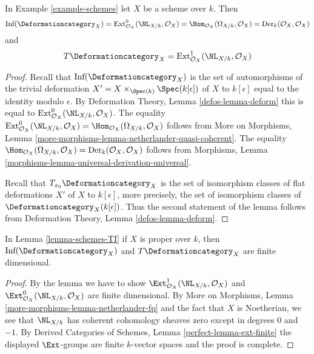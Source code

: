 \begin{lemma}
\label{lemma-schemes-TI}
In Example \ref{example-schemes} let $X$ be a scheme over $k$. Then
$$
\text{Inf}(\Deformationcategory_X) =
\text{Ext}^0_{\mathcal{O}_X}(\NL_{X/k}, \mathcal{O}_X) =
\Hom_{\mathcal{O}_X}(\Omega_{X/k}, \mathcal{O}_X) =
\text{Der}_k(\mathcal{O}_X, \mathcal{O}_X)
$$
and
$$
T\Deformationcategory_X =
\text{Ext}^1_{\mathcal{O}_X}(\NL_{X/k}, \mathcal{O}_X)
$$
\end{lemma}

\begin{proof}
Recall that $\text{Inf}(\Deformationcategory_X)$ is the set of
automorphisms of the trivial deformation
$X' = X \times_{\Spec(k)} \Spec(k[\epsilon])$ of $X$ to $k[\epsilon]$
equal to the identity modulo $\epsilon$.
By Deformation Theory, Lemma \ref{defos-lemma-deform}
this is equal to $\text{Ext}^0_{\mathcal{O}_X}(\NL_{X/k}, \mathcal{O}_X)$.
The equality $\text{Ext}^0_{\mathcal{O}_X}(\NL_{X/k}, \mathcal{O}_X) =
\Hom_{\mathcal{O}_X}(\Omega_{X/k}, \mathcal{O}_X)$ follows from
More on Morphisms, Lemma
\ref{more-morphisms-lemma-netherlander-quasi-coherent}.
The equality
$\Hom_{\mathcal{O}_X}(\Omega_{X/k}, \mathcal{O}_X) =
\text{Der}_k(\mathcal{O}_X, \mathcal{O}_X)$
follows from Morphisms, Lemma
\ref{morphisms-lemma-universal-derivation-universal}.

\medskip\noindent
Recall that $T_{x_0}\Deformationcategory_X$ is the set of isomorphism classes
of flat deformations $X'$ of $X$ to $k[\epsilon]$, more precisely,
the set of isomorphism classes of $\Deformationcategory_X(k[\epsilon])$.
Thus the second statement of the lemma follows from
Deformation Theory, Lemma \ref{defos-lemma-deform}.
\end{proof}

\begin{lemma}
\label{lemma-proper-schemes-TI}
In Lemma \ref{lemma-schemes-TI} if $X$ is proper over $k$, then
$\text{Inf}(\Deformationcategory_X)$ and $T\Deformationcategory_X$ are
finite dimensional.
\end{lemma}

\begin{proof}
By the lemma we have to show
$\Ext^1_{\mathcal{O}_X}(\NL_{X/k}, \mathcal{O}_X)$ and
$\Ext^0_{\mathcal{O}_X}(\NL_{X/k}, \mathcal{O}_X)$ are finite
dimensional. By More on Morphisms, Lemma
\ref{more-morphisms-lemma-netherlander-fp}
and the fact that $X$ is Noetherian, we see that
$\NL_{X/k}$ has coherent cohomology sheaves zero except
in degrees $0$ and $-1$.
By Derived Categories of Schemes, Lemma \ref{perfect-lemma-ext-finite}
the displayed $\Ext$-groups are finite $k$-vector spaces
and the proof is complete.
\end{proof}

